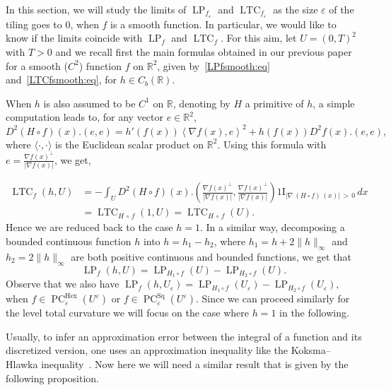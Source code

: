 \documentclass[10pt]{amsart}
\theoremstyle{definition}\newtheorem{defi}[theo]{Definition}\newtheorem{rema}[theo]{Remark}\newtheorem{exam}[theo]{Example}\newtheorem{exem}[theo]{Example}\newtheorem{nota}[theo]{Notation}
\newcommand{\R}{\mathbb{R}}
\newcommand{\ind}{{1\!\!\mathrm{I}}}
\newcommand{\eps}{\varepsilon}
\DeclareMathOperator{\LTC}{LTC}
\DeclareMathOperator{\LP}{LP}
\DeclareMathOperator{\PC}{PC}
\DeclareMathOperator{\Hex}{Hex}
\DeclareMathOperator{\Sq}{Sq}
\begin{document}
In this section, we will study the limits of $\LP_{f_\eps}$ and $\LTC_{f_\eps}$ as the size $\eps$ of the tiling goes to $0$, when $f$ is a smooth function. In particular, we would like to know if the limits coincide with $\LP_f$ and $\LTC_f$. For this aim, let $U=(0,T)^2$ with $T>0$ and we recall first the main formulas obtained in our previous paper~\cite{BD-Geometry-published} for a smooth ($C^2$) function $f$ on $\R^2$, given by~\eqref{LPfsmooth:eq} and~\eqref{LTCfsmooth:eq}, for $h\in C_b(\R)$.


When $h$ is also assumed to be $C^1$ on $\R$, denoting by $H$ a primitive of $h$, a simple computation leads to, for any vector $e\in\R^2$, 
\[
D^2(H\circ f)(x).(e,e) = h'(f(x))\left\langle \nabla f(x),e\right\rangle^2 +
h(f(x)) D^2 f(x).(e,e),
\]
where $\langle \cdot,\cdot\rangle$ is the Euclidean scalar product on $\R^2$. Using this formula with $e=\tfrac{\nabla f(x)^\perp}{|\nabla f(x)|} $, we get, 

\begin{align*}
\LTC_f (h,U) & = - \int_U D^2(H\circ f)(x).\left(\frac{\nabla f(x)^\perp}{\left|\nabla f(x)\right|}, \frac{\nabla f(x)^\perp}{\left|\nabla f(x)\right|} \right) \ind_{\left|\nabla\,(H\circ f)\,(x)\right|\,>\,0} \, dx \\
&= \LTC_{H\,\circ\,f} (1,U) = \LTC_{H\,\circ\,f} (U).
\end{align*}
Hence we are reduced back to the case $h=1$. In a similar way, decomposing a bounded continuous function $h$ into $h=h_1-h_2$, where $h_1=h +2 \|h\|_\infty$ and $h_2=2 \| h\|_\infty$ are both positive continuous and bounded functions, we get that
\[
\LP_f (h,U) = \LP_{H_1\circ f} (U)-\LP_{H_2\circ f} (U).
\]
Observe that we also have $\LP_f (h,U_\eps) = \LP_{H_1\circ f} (U_\eps)-\LP_{H_2\circ f} (U_\eps),$ when $f\in\PC^{\Hex}_\eps(U^{\eps})$ or $f\in \PC^{\Sq}_\eps(U^{\eps})$. Since we can proceed similarly for the level total curvature we will focus on the case where $h=1$ in the following.

%
%

Usually, to infer an approximation error between the integral of a function and its discretized version, one uses an approximation inequality like the Koksma--Hlawka inequality~\cite{PausingerSvane2015}. Now here we will need a similar result that is given by the following proposition.
\end{document}
